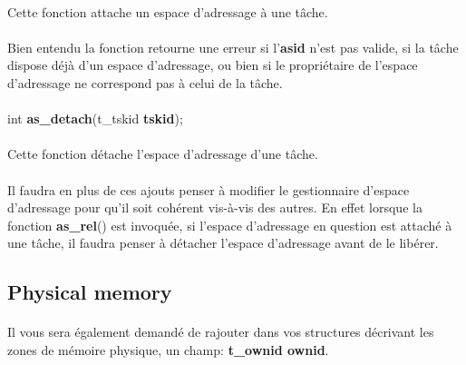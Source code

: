 \documentclass[10pt,a4wide]{article}
\begin{document}
\paragraph{}

Cette fonction attache un espace d'adressage \`a une t\^ache.

\paragraph{}

Bien entendu la fonction retourne une erreur si l'\textbf{asid} n'est
pas valide, si la t\^ache dispose d\'ej\`a d'un espace d'adressage, ou
bien si le propri\'etaire de l'espace d'adressage ne correspond pas
\`a celui de la t\^ache.

\paragraph{}

\hspace{1.5cm}int \textbf{as\_detach}(t\_tskid \textbf{tskid});

\paragraph{}

Cette fonction d\'etache l'espace d'adressage d'une t\^ache.

\paragraph{}

Il faudra en plus de ces ajouts penser \`a modifier le gestionnaire d'espace
d'adressage pour qu'il soit coh\'erent vis-\`a-vis des autres. En effet
lorsque la fonction \textbf{as\_rel}() est invoqu\'ee, si l'espace
d'adressage en question est attach\'e \`a une t\^ache, il faudra penser
\`a d\'etacher l'espace d'adressage avant de le lib\'erer.

\subsection{Physical memory}

\paragraph{}

Il vous sera \'egalement demand\'e de rajouter dans vos structures
d\'ecrivant les zones de m\'emoire physique, un champ:
\textbf{t\_ownid ownid}.
\end{document}
